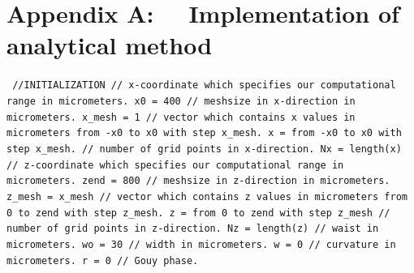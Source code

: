 \documentclass[a4paper]{article}
\begin{document}
	\section*{Appendix A: ~~Implementation of analytical method}
	\texttt{\noindent
		\textcolor{OliveGreen}{//INITIALIZATION\newline\newline
			// x-coordinate which specifies our computational range in micrometers}.\newline
		x0 = 400 \newline
		\textcolor{OliveGreen}{// meshsize in x-direction in micrometers.}\newline
		x\_mesh = 1 \newline
		\textcolor{OliveGreen}{// vector which contains x values in micrometers from -x0 to x0 with step x\_mesh.}\newline
		x = from -x0 to x0 with step x\_mesh.\newline
		\textcolor{OliveGreen}{// number of grid points in x-direction.}\newline
		Nx = length(x)\newline
		\textcolor{OliveGreen}{// z-coordinate which specifies our computational range in micrometers.}\newline
		zend = 800 \newline
		\textcolor{OliveGreen}{// meshsize in z-direction in micrometers.}\newline
		z\_mesh = x\_mesh \newline
		\textcolor{OliveGreen}{// vector which contains z values in micrometers from 0 to zend with step z\_mesh.}\newline
		z = from 0 to zend with step z\_mesh\newline
		\textcolor{OliveGreen}{// number of grid points in z-direction.}\newline
		Nz = length(z)\newline
		\textcolor{OliveGreen}{// waist in micrometers.}\newline
		wo = 30 \newline
		\textcolor{OliveGreen}{// width in micrometers.}\newline
		w = 0 \newline
		\textcolor{OliveGreen}{// curvature in micrometers.}\newline
		r = 0 \newline
		\textcolor{OliveGreen}{// Gouy phase.}\newline
}
\end{document}
